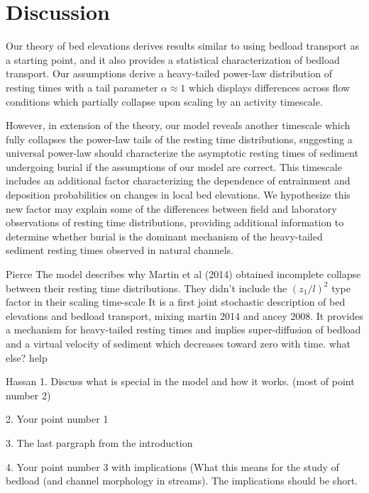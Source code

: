 \documentclass[draft]{agujournal2018}
\begin{document}
\section{Discussion}

Our theory of bed elevations derives results similar to \citet{Martin2014} using bedload transport as a starting point, and it also provides a statistical characterization of bedload transport.
Our assumptions derive a heavy-tailed power-law distribution of resting times with a tail parameter $\alpha \approx 1$ which displays differences across flow conditions which partially collapse upon scaling by an activity timescale.

However, in extension of the \citet{Martin2014} theory, our model reveals another timescale which fully collapses the power-law tails of the resting time distributions, suggesting a universal power-law should characterize the asymptotic resting times of sediment undergoing burial if the assumptions of our model are correct.
This timescale includes an additional factor characterizing the dependence of entrainment and deposition probabilities on changes in local bed elevations.
We hypothesize this new factor may explain some of the differences between field \citep[e.g.][]{Olinde2015} and laboratory \citep[e.g.][]{Martin2014} observations of resting time distributions, providing additional information to determine whether burial is the dominant mechanism of the heavy-tailed sediment resting times observed in natural channels.


Pierce
The model describes why Martin et al (2014) obtained incomplete collapse between their resting time distributions. They didn't include the $(z_1/l)^2$ type factor in their scaling time-scale
It is a first joint stochastic description of bed elevations and bedload transport, mixing martin 2014 and ancey 2008. 
It provides a mechanism for heavy-tailed resting times and implies super-diffusion of bedload and a virtual velocity of sediment which decreases toward zero with time. 
 what else? help



Hassan
1.      Discuss what is special in the model and how it works. (most of point number 2)

2.      Your point number 1

3.      The last pargraph from the introduction

4.      Your point number 3 with implications (What this means for the study of bedload (and channel morphology in streams). The implications should be short.
\end{document}
